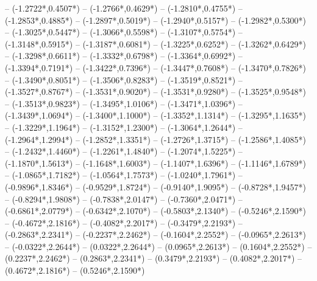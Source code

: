 {	-- ({-1.2722*\dx},{0.4507*\dy})
	-- ({-1.2766*\dx},{0.4629*\dy})
	-- ({-1.2810*\dx},{0.4755*\dy})
	-- ({-1.2853*\dx},{0.4885*\dy})
	-- ({-1.2897*\dx},{0.5019*\dy})
	-- ({-1.2940*\dx},{0.5157*\dy})
	-- ({-1.2982*\dx},{0.5300*\dy})
	-- ({-1.3025*\dx},{0.5447*\dy})
	-- ({-1.3066*\dx},{0.5598*\dy})
	-- ({-1.3107*\dx},{0.5754*\dy})
	-- ({-1.3148*\dx},{0.5915*\dy})
	-- ({-1.3187*\dx},{0.6081*\dy})
	-- ({-1.3225*\dx},{0.6252*\dy})
	-- ({-1.3262*\dx},{0.6429*\dy})
	-- ({-1.3298*\dx},{0.6611*\dy})
	-- ({-1.3332*\dx},{0.6798*\dy})
	-- ({-1.3364*\dx},{0.6992*\dy})
	-- ({-1.3394*\dx},{0.7191*\dy})
	-- ({-1.3422*\dx},{0.7396*\dy})
	-- ({-1.3447*\dx},{0.7608*\dy})
	-- ({-1.3470*\dx},{0.7826*\dy})
	-- ({-1.3490*\dx},{0.8051*\dy})
	-- ({-1.3506*\dx},{0.8283*\dy})
	-- ({-1.3519*\dx},{0.8521*\dy})
	-- ({-1.3527*\dx},{0.8767*\dy})
	-- ({-1.3531*\dx},{0.9020*\dy})
	-- ({-1.3531*\dx},{0.9280*\dy})
	-- ({-1.3525*\dx},{0.9548*\dy})
	-- ({-1.3513*\dx},{0.9823*\dy})
	-- ({-1.3495*\dx},{1.0106*\dy})
	-- ({-1.3471*\dx},{1.0396*\dy})
	-- ({-1.3439*\dx},{1.0694*\dy})
	-- ({-1.3400*\dx},{1.1000*\dy})
	-- ({-1.3352*\dx},{1.1314*\dy})
	-- ({-1.3295*\dx},{1.1635*\dy})
	-- ({-1.3229*\dx},{1.1964*\dy})
	-- ({-1.3152*\dx},{1.2300*\dy})
	-- ({-1.3064*\dx},{1.2644*\dy})
	-- ({-1.2964*\dx},{1.2994*\dy})
	-- ({-1.2852*\dx},{1.3351*\dy})
	-- ({-1.2726*\dx},{1.3715*\dy})
	-- ({-1.2586*\dx},{1.4085*\dy})
	-- ({-1.2432*\dx},{1.4460*\dy})
	-- ({-1.2261*\dx},{1.4840*\dy})
	-- ({-1.2074*\dx},{1.5225*\dy})
	-- ({-1.1870*\dx},{1.5613*\dy})
	-- ({-1.1648*\dx},{1.6003*\dy})
	-- ({-1.1407*\dx},{1.6396*\dy})
	-- ({-1.1146*\dx},{1.6789*\dy})
	-- ({-1.0865*\dx},{1.7182*\dy})
	-- ({-1.0564*\dx},{1.7573*\dy})
	-- ({-1.0240*\dx},{1.7961*\dy})
	-- ({-0.9896*\dx},{1.8346*\dy})
	-- ({-0.9529*\dx},{1.8724*\dy})
	-- ({-0.9140*\dx},{1.9095*\dy})
	-- ({-0.8728*\dx},{1.9457*\dy})
	-- ({-0.8294*\dx},{1.9808*\dy})
	-- ({-0.7838*\dx},{2.0147*\dy})
	-- ({-0.7360*\dx},{2.0471*\dy})
	-- ({-0.6861*\dx},{2.0779*\dy})
	-- ({-0.6342*\dx},{2.1070*\dy})
	-- ({-0.5803*\dx},{2.1340*\dy})
	-- ({-0.5246*\dx},{2.1590*\dy})
	-- ({-0.4672*\dx},{2.1816*\dy})
	-- ({-0.4082*\dx},{2.2017*\dy})
	-- ({-0.3479*\dx},{2.2193*\dy})
	-- ({-0.2863*\dx},{2.2341*\dy})
	-- ({-0.2237*\dx},{2.2462*\dy})
	-- ({-0.1604*\dx},{2.2552*\dy})
	-- ({-0.0965*\dx},{2.2613*\dy})
	-- ({-0.0322*\dx},{2.2644*\dy})
	-- ({0.0322*\dx},{2.2644*\dy})
	-- ({0.0965*\dx},{2.2613*\dy})
	-- ({0.1604*\dx},{2.2552*\dy})
	-- ({0.2237*\dx},{2.2462*\dy})
	-- ({0.2863*\dx},{2.2341*\dy})
	-- ({0.3479*\dx},{2.2193*\dy})
	-- ({0.4082*\dx},{2.2017*\dy})
	-- ({0.4672*\dx},{2.1816*\dy})
	-- ({0.5246*\dx},{2.1590*\dy})
}
